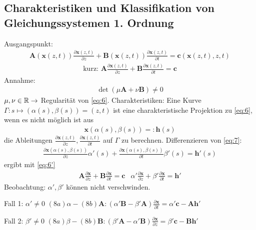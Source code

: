 \newpage
\subsection{Charakteristiken und Klassifikation von Gleichungssystemen 1. Ordnung}
\label{sec:3.2}
Ausgangspunkt: 
\begin{align}
\label{eq:6}
\bm{A}(\bm{x}(z,t))\frac{\partial \bm{x}(z,t)}{\partial z}+\bm{B}(\bm{x}(z,t))\frac{\partial \bm{x}(z,t)}{\partial t} = \bm{c}(\bm{x}(z,t),z,t)
\end{align}
\begin{align*}
\label{eq:6'}
\textrm{kurz: } \bm{A}\frac{\partial \bm{x}(z,t)}{\partial z}+\bm{B}\frac{\partial \bm{x}(z,t)}{\partial t}=\bm{c} \tag{6'}
\end{align*}
Annahme:
\begin{align*}
\det(\mu \bm{A}+ \nu \bm{B}) \neq 0 
\end{align*}
$\mu, \nu \in \mathbb{R} \rightarrow$ Regularität von \eqref{eq:6}.
Charakteristiken: 
Eine Kurve $\Gamma:s \mapsto (\alpha(s),\beta(s))=(z,t)$ ist eine charakteristische Projektion zu \eqref{eq:6}, wenn es nicht möglich ist aus
\begin{align} 
\label{eq:7}
\bm{x}(\alpha(s),\beta(s))=:\bm{h}(s)
\end{align}
die Ableitungen $\frac{\partial \bm{x}(z,t)}{\partial z}, \frac{\partial \bm{x}(z,t)}{\partial t}$ auf $\Gamma$ zu berechnen.
Differenzieren von \eqref{eq:7}:
\begin{align*}
\frac{\partial \bm{x}(\alpha(s),\beta(s))}{\partial z}\alpha'(s)+\frac{\partial \bm{x}(\alpha(s),\beta(s))}{\partial t}\beta'(s)=\bm{h}'(s)
\end{align*}
ergibt mit \eqref{eq:6'}
\begin{subequations}
\begin{align}
\bm{A}\frac{\partial \bm{x}}{\partial z}+\bm{B}\frac{\partial \bm{x}}{\partial t} =\bm{c}
\end{align}
\begin{align}
\alpha'\frac{\partial \bm{x}}{\partial z}+\beta'\frac{\partial \bm{x}}{\partial t} =\bm{h}'
\end{align}
\end{subequations}
Beobachtung: $\alpha', \beta'$ können nicht verschwinden.

Fall 1: $\alpha' \neq 0$
$(8a)\alpha-(8b)\bm{A}:(\alpha'\bm{B}-\beta'\bm{A})\frac{\partial \bm{x}}{\partial t}=\alpha'\bm{c}-\bm{A}\bm{h}'$

Fall 2: $\beta' \neq 0$
$(8a)\beta-(8b)\bm{B}:(\beta'\bm{A}-\alpha'\bm{B})\frac{\partial \bm{x}}{\partial z}=\beta'\bm{c}-\bm{B}\bm{h}'$


